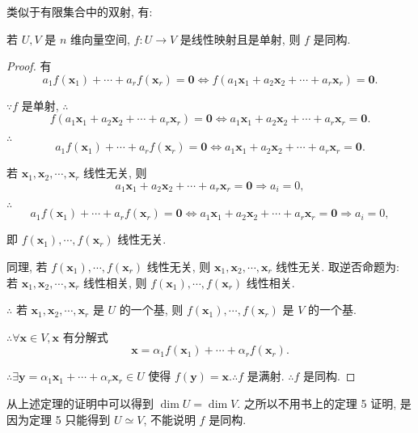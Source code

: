 \documentclass[color=black,device=normal,lang=cn,mode=geye]{elegantnote}
\begin{document}
类似于有限集合中的双射, 有:
\begin{theorem}\label{t1.5}
    若 $U,V$ 是 $n$ 维向量空间, $f:U\to V$ 是线性映射且是单射, 则 $f$ 是同构.
\end{theorem}
\begin{proof}
    有
    \[a_1f(\boldsymbol{x}_1)+\cdots+a_rf(\boldsymbol{x}_r)=\boldsymbol{0}\Leftrightarrow f(a_1\boldsymbol{x}_1+a_2\boldsymbol{x}_2+\cdots+a_r\boldsymbol{x}_r)=\boldsymbol{0}.\]

    $\because f$ 是单射, $\therefore$
    \[f(a_1\boldsymbol{x}_1+a_2\boldsymbol{x}_2+\cdots+a_r\boldsymbol{x}_r)=\boldsymbol{0}\Leftrightarrow a_1\boldsymbol{x}_1+a_2\boldsymbol{x}_2+\cdots+a_r\boldsymbol{x}_r=\boldsymbol{0}.\]

    $\therefore$
    \[a_1f(\boldsymbol{x}_1)+\cdots+a_rf(\boldsymbol{x}_r)=\boldsymbol{0}\Leftrightarrow a_1\boldsymbol{x}_1+a_2\boldsymbol{x}_2+\cdots+a_r\boldsymbol{x}_r=\boldsymbol{0}.\]
    
    若 $\boldsymbol{x}_1,\boldsymbol{x}_2,\cdots,\boldsymbol{x}_r$ 线性无关, 则
    \[a_1\boldsymbol{x}_1+a_2\boldsymbol{x}_2+\cdots+a_r\boldsymbol{x}_r=\boldsymbol{0}\Rightarrow a_i=0,\]

    $\therefore$
    \[a_1f(\boldsymbol{x}_1)+\cdots+a_rf(\boldsymbol{x}_r)=\boldsymbol{0}\Leftrightarrow a_1\boldsymbol{x}_1+a_2\boldsymbol{x}_2+\cdots+a_r\boldsymbol{x}_r=\boldsymbol{0}\Rightarrow a_i=0,\]

    即 $f(\boldsymbol{x}_1),\cdots,f(\boldsymbol{x}_r)$ 线性无关.

    同理, 若 $f(\boldsymbol{x}_1),\cdots,f(\boldsymbol{x}_r)$ 线性无关, 则 $\boldsymbol{x}_1,\boldsymbol{x}_2,\cdots,\boldsymbol{x}_r$ 线性无关. 取逆否命题为: 若 $\boldsymbol{x}_1,\boldsymbol{x}_2,\cdots,\boldsymbol{x}_r$ 线性相关, 则 $f(\boldsymbol{x}_1),\cdots,f(\boldsymbol{x}_r)$ 线性相关.

    $\therefore$ 若 $\boldsymbol{x}_1,\boldsymbol{x}_2,\cdots,\boldsymbol{x}_r$ 是 $U$ 的一个基, 则 $f(\boldsymbol{x}_1),\cdots,f(\boldsymbol{x}_r)$ 是 $V$ 的一个基.

    $\therefore\forall\boldsymbol{x}\in V,\boldsymbol{x}$ 有分解式
    \[\boldsymbol{x}=\alpha_1f(\boldsymbol{x}_1)+\cdots+\alpha_rf(\boldsymbol{x}_r).\]

    $\therefore\exists\boldsymbol{y}=\alpha_1\boldsymbol{x}_1+\cdots+\alpha_r\boldsymbol{x}_r\in U$ 使得 $f(\boldsymbol{y})=\boldsymbol{x}.\therefore f$ 是满射. $\therefore f$ 是同构.
\end{proof}
\begin{note}
    从上述定理的证明中可以得到 $\dim U=\dim V$. 之所以不用书上的定理 5 证明, 是因为定理 5 只能得到 $U\simeq V$, 不能说明 $f$ 是同构.
\end{note}
\end{document}
